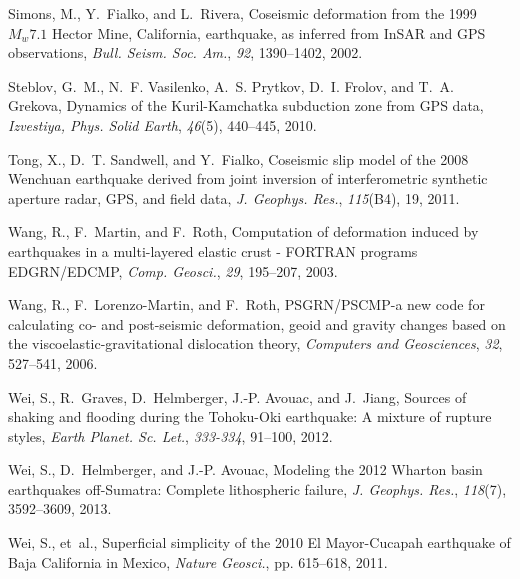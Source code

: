 \documentclass[10pt]{article}
\begin{document}
\begin{thebibliography}{30}
Simons, M., Y.~Fialko, and L.~Rivera, {Coseismic deformation from the 1999
  $M_w7.1$ Hector Mine, California, earthquake, as inferred from InSAR and GPS
  observations}, \textit{Bull. Seism. Soc. Am.}, \textit{92}, 1390--1402, 2002.

Steblov, G.~M., N.~F. Vasilenko, A.~S. Prytkov, D.~I. Frolov, and T.~A.
  Grekova, {Dynamics of the Kuril-Kamchatka subduction zone from GPS data},
  \textit{Izvestiya, Phys. Solid Earth}, \textit{46}(5), 440--445, 2010.

Tong, X., D.~T. Sandwell, and Y.~Fialko, {Coseismic slip model of the 2008
  Wenchuan earthquake derived from joint inversion of interferometric synthetic
  aperture radar, GPS, and field data}, \textit{J. Geophys. Res.},
  \textit{115}(B4), 19, 2011.

Wang, R., F.~Martin, and F.~Roth, {Computation of deformation induced by
  earthquakes in a multi-layered elastic crust - FORTRAN programs EDGRN/EDCMP},
  \textit{Comp. Geosci.}, \textit{29}, 195--207, 2003.

Wang, R., F.~Lorenzo-Martin, and F.~Roth, {PSGRN/PSCMP}-a new code for
  calculating co- and post-seismic deformation, geoid and gravity changes based
  on the viscoelastic-gravitational dislocation theory, \textit{Computers and
  Geosciences}, \textit{32}, 527--541, 2006.

Wei, S., R.~Graves, D.~Helmberger, J.-P. Avouac, and J.~Jiang, {Sources of
  shaking and flooding during the Tohoku-Oki earthquake: A mixture of rupture
  styles}, \textit{Earth Planet. Sc. Let.}, \textit{333-334}, 91--100, 2012.

Wei, S., D.~Helmberger, and J.-P. Avouac, {Modeling the 2012 Wharton basin
  earthquakes off-Sumatra: Complete lithospheric failure}, \textit{J. Geophys.
  Res.}, \textit{118}(7), 3592--3609, 2013.

Wei, S., et~al., {Superficial simplicity of the 2010 El Mayor-Cucapah
  earthquake of Baja California in Mexico}, \textit{Nature Geosci.}, pp.
  615--618, 2011.

\end{thebibliography}



\clearpage
\end{document}
